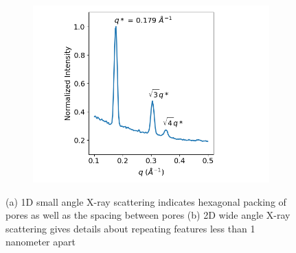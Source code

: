 \documentclass{article}
\begin{document}
  \begin{figure}
        \centering
        \begin{subfigure}[t]{0.43\linewidth}
                \centering
                \includegraphics[width=\linewidth]{SAXS.png}
                \caption{}\label{fig:SAXS}
        \end{subfigure}
        \begin{subfigure}[t]{0.47\linewidth}
                \centering
                \caption{}\label{fig:WAXS}
        \end{subfigure}
        \caption{(a) 1D small angle X-ray scattering indicates hexagonal packing of
        pores as well as the spacing between pores (b) 2D wide angle X-ray scattering
        gives details about repeating features less than 1 nanometer apart}\label{fig:SWAXS}
 \end{figure}
\end{document}
